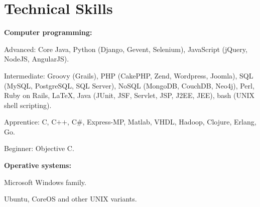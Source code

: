


\section{Technical Skills}
%
% 
% 
\textbf{Computer programming:}

    \begin{innerlist}
\item Advanced: Core Java, Python (Django, Gevent, Selenium), JavaScript
(jQuery, NodeJS, AngularJS).
\item Intermediate: Groovy (Grails), PHP
(CakePHP, Zend, Wordpress, Joomla), SQL (MySQL, PostgreSQL, SQL Server), NoSQL (MongoDB,
CouchDB, Neo4j), Perl, Ruby on Rails, \LaTeX{}, 
Java (JUnit, JSF, Servlet, JSP, J2EE, JEE), bash (UNIX shell scripting).
\item Apprentice: C, C$+$$+$, C\#, Express-MP, Matlab, VHDL, Hadoop, Clojure,
Erlang, Go.
\item Beginner: Objective C.
    \end{innerlist}

\halfblankline

\textbf{Operative systems:}
    \begin{innerlist}
\item Microsoft Windows family.
\item Ubuntu, CoreOS and other UNIX variants.
    \end{innerlist}

